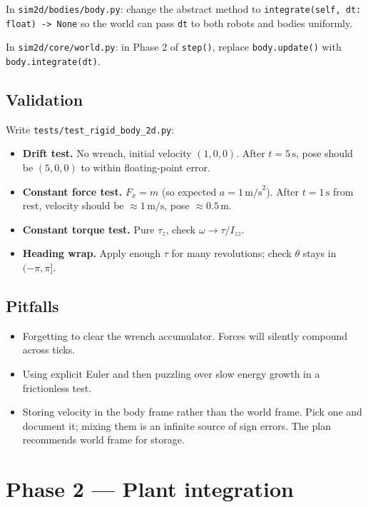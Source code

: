 \documentclass[11pt,a4paper]{article}
\newcommand{\code}[1]{\texttt{\small #1}}
\newcommand{\file}[1]{\texttt{\small #1}}
\begin{document}
In \file{sim2d/bodies/body.py}: change the abstract method to
\code{integrate(self, dt: float) -> None} so the world can pass \code{dt}
to both robots and bodies uniformly.

In \file{sim2d/core/world.py}: in Phase 2 of \code{step()}, replace
\code{body.update()} with \code{body.integrate(dt)}.

\subsection*{Validation}

Write \file{tests/test\_rigid\_body\_2d.py}:
\begin{itemize}
    \item \textbf{Drift test.} No wrench, initial velocity $(1, 0, 0)$.
        After $t = 5\,\text{s}$, pose should be $(5, 0, 0)$ to within
        floating-point error.
    \item \textbf{Constant force test.} $F_x = m$ (so expected
        $a = 1\,\text{m/s}^2$). After $t = 1\,\text{s}$ from rest, velocity
        should be $\approx 1\,\text{m/s}$, pose $\approx 0.5\,\text{m}$.
    \item \textbf{Constant torque test.} Pure $\tau_z$, check
        $\omega \to \tau/I_{zz}$.
    \item \textbf{Heading wrap.} Apply enough $\tau$ for many revolutions;
        check $\theta$ stays in $(-\pi, \pi]$.
\end{itemize}

\subsection*{Pitfalls}

\begin{itemize}
    \item Forgetting to clear the wrench accumulator. Forces will silently
        compound across ticks.
    \item Using explicit Euler and then puzzling over slow energy growth
        in a frictionless test.
    \item Storing velocity in the body frame rather than the world frame.
        Pick one and document it; mixing them is an infinite source of
        sign errors. The plan recommends world frame for storage.
\end{itemize}

\section{Phase 2 --- Plant integration}
\label{sec:plant}
\end{document}
